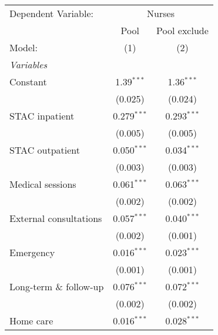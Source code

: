 
\begingroup
\centering
\begin{tabular}{lcc}
   \tabularnewline \midrule \midrule
   Dependent Variable:    & \multicolumn{2}{c}{Nurses}                                 \\
                          & Pool                       & Pool exclude                  \\
   Model:                 & (1)                        & (2)                           \\
   \midrule
   \emph{Variables}                                                                    \\
   Constant               & 1.39$^{***}$               & 1.36$^{***}$                  \\
                          & (0.025)                    & (0.024)                       \\
   STAC inpatient         & 0.279$^{***}$              & 0.293$^{***}$                 \\
                          & (0.005)                    & (0.005)                       \\
   STAC outpatient        & 0.050$^{***}$              & 0.034$^{***}$                 \\
                          & (0.003)                    & (0.003)                       \\
   Medical sessions       & 0.061$^{***}$              & 0.063$^{***}$                 \\
                          & (0.002)                    & (0.002)                       \\
   External consultations & 0.057$^{***}$              & 0.040$^{***}$                 \\
                          & (0.002)                    & (0.001)                       \\
   Emergency              & 0.016$^{***}$              & 0.023$^{***}$                 \\
                          & (0.001)                    & (0.001)                       \\
   Long-term \& follow-up & 0.076$^{***}$              & 0.072$^{***}$                 \\
                          & (0.002)                    & (0.002)                       \\
   Home care              & 0.016$^{***}$              & 0.028$^{***}$                 \\

\end{tabular}
